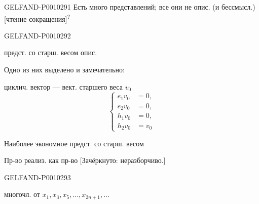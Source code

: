 \begin{GelfandAdjacentEvidence}{GELFAND-P001029}{1}
Есть много представлений; все они не опис. (и бессмысл.) [чтение сокращения]\textsuperscript{?}
\end{GelfandAdjacentEvidence}
\begin{GelfandAdjacentEvidence}{GELFAND-P001029}{2}


предст. со старш. весом опис.

Одно из них выделено и замечательно:

циклич. вектор --- вект. старшего веса $v_0$
\begin{equation*}
\left\{\begin{aligned}
e_1v_0&=0,\\
e_2v_0&=0,\\
h_1v_0&=0,\\
h_2v_0&=v_0
\end{aligned}\right.
\tag{4}
\end{equation*}

Наиболее экономное предст. со старш. весом

Пр-во реализ. как пр-во [Зачёркнуто: неразборчиво.]
\end{GelfandAdjacentEvidence}
\begin{GelfandAdjacentEvidence}{GELFAND-P001029}{3}

многочл. от $x_1,x_3,x_5,\ldots,x_{2n+1},\ldots$
\end{GelfandAdjacentEvidence}
